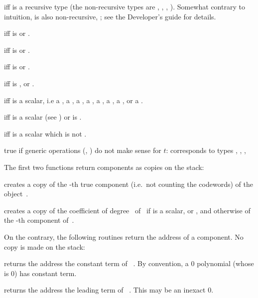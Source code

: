   iff  is a recursive
type (the non-recursive types are , ,
, ). Somewhat contrary to intuition,  is
also non-recursive, ; see the Developer's guide for details.

  iff  is 
or .

  iff  is 
or .

  iff  is 
or .

  iff  is , 
or .

  iff  is a scalar, i.e
a ,
a ,
a ,
a ,
a ,
a ,
a ,
or
a .

  iff  is a scalar (see
) or  is .

  iff  is a scalar which is not
.

 true if generic operations (,
) do not make sense for $t$: corresponds to types
, , , 

\label{se:accessors}
The first two functions return  components as copies on the stack:

 creates a copy of the -th true
component (i.e.\ not counting the codewords) of the object~.

 creates a copy of the coefficient of
degree~ of~ if  is a scalar,  or ,
and otherwise of the -th component of~.
\smallskip

\noindent On the contrary, the following routines return the address of a
 component. No copy is made on the stack:

 returns the address the constant term of
~. By convention, a $0$ polynomial (whose  is $0$)
has  constant term.

 returns the address the leading term of
~. This may be an inexact $0$.

